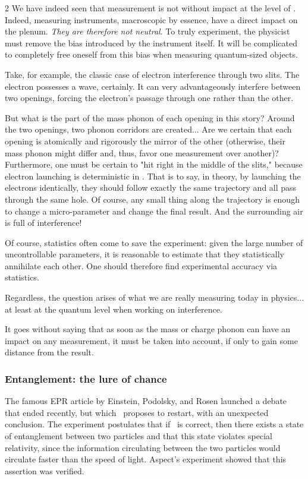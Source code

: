 \begin{multicols}{2}
	We have indeed seen that measurement is not without impact at the level of \PQ. Indeed, measuring instruments, macroscopic by essence, have a direct impact on the plenum. \textit{They are therefore not neutral}. To truly experiment, the physicist must remove the bias introduced by the instrument itself. It will be complicated to completely free oneself from this bias when measuring quantum-sized objects.
	
	Take, for example, the classic case of electron interference through two slits. The electron possesses a wave, certainly. It can very advantageously interfere between two openings, forcing the electron's passage through one rather than the other.
	
	But what is the part of the mass phonon of each opening in this story? Around the two openings, two phonon corridors are created... Are we certain that each opening is atomically and rigorously the mirror of the other (otherwise, their mass phonon might differ and, thus, favor one measurement over another)? Furthermore, one must be certain to "hit right in the middle of the slits," because electron launching is deterministic in \PQ. That is to say, in theory, by launching the electrons identically, they should follow exactly the same trajectory and all pass through the same hole. Of course, any small thing along the trajectory is enough to change a micro-parameter and change the final result. And the surrounding air is full of interference!
	
	Of course, statistics often come to save the experiment: given the large number of uncontrollable parameters, it is reasonable to estimate that they statistically annihilate each other. One should therefore find experimental accuracy via statistics.
	
	Regardless, the question arises of what we are really measuring today in physics... at least at the quantum level when working on interference.
	
	It goes without saying that as soon as the mass or charge phonon can have an impact on any measurement, it must be taken into account, if only to gain some distance from the result.
	
	\subsubsection{Entanglement: the lure of chance}
	
	The famous EPR article\cite{einstein1935can} by Einstein, Podolsky, and Rosen launched a debate that ended recently, but which \PQ\ proposes to restart, with an unexpected conclusion. The experiment postulates that if \MQ\ is correct, then there exists a state of entanglement between two particles and that this state violates special relativity, since the information circulating between the two particles would circulate faster than the speed of light. Aspect's experiment\cite{aspect1982experimental} showed that this assertion was verified.
	

\end{multicols}

